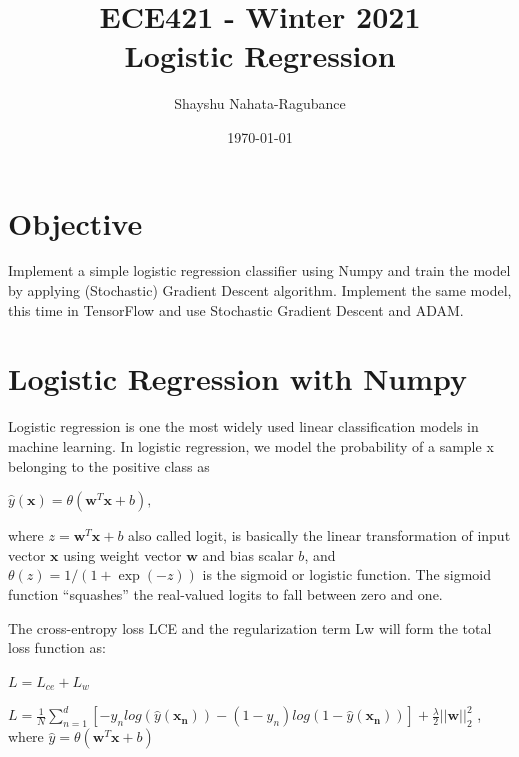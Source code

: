 \documentclass[12pt]{article}
\title{ECE421 - Winter 2021 \\ Logistic Regression}
\author{Shayshu Nahata-Ragubance}
\date{\today}
\begin{document}
\maketitle

\section{Objective}
Implement a simple logistic regression classifier using Numpy and
train the model by applying (Stochastic) Gradient Descent algorithm. Implement
the same model, this time in TensorFlow and use Stochastic Gradient Descent and ADAM.

\section{Logistic Regression with Numpy}
Logistic regression is one the most widely used linear classification models in machine learning. In
logistic regression, we model the probability of a sample x belonging to the positive class as

\begin{center}
  $\hat{y}(\mathbf{x}) = \theta (\mathbf{w}^T\mathbf{x} + b),$
\end{center}

where $z = \mathbf{w}^T\mathbf{x} + b$  also called logit, is basically the linear transformation of input vector $\mathbf{x}$ using
weight vector $\mathbf{w}$ and bias scalar $b$, and $\theta (z) = 1/(1 + \exp(-z))$ is the sigmoid or logistic function.
The sigmoid function “squashes” the real-valued logits to fall between zero and one.

The cross-entropy loss LCE and the regularization term Lw will form the total loss function as:
\begin{center}

  $L = L_{ce} + L_{w}$

  $L = \frac{1}{N} \sum_{n = 1}^{d} [-y_n log( \hat{y}(\mathbf{x_n})) -  (1-y_n)log(1- \hat{y}(\mathbf{x_n}))]  +  \frac{\lambda}{2}||\mathbf{w}||_2^2$
  , where $\hat{y} = \theta(\mathbf{w}^T\mathbf{x} + b)$
\end{center}
\end{document}
